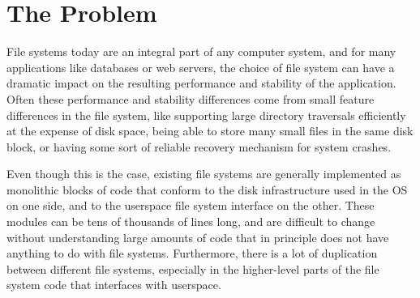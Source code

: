\section{The Problem}
\label{sec:problem}

File systems today are an integral part of any computer system, and for many
applications like databases or web servers, the choice of file system can have a
dramatic impact on the resulting performance and stability of the application.
Often these performance and stability differences come from small feature
differences in the file system, like supporting large directory traversals
efficiently at the expense of disk space, being able to store many small files
in the same disk block, or having some sort of reliable recovery mechanism for
system crashes.

Even though this is the case, existing file systems are generally implemented as
monolithic blocks of code that conform to the disk infrastructure used in the OS
on one side, and to the userspace file system interface on the other. These
modules can be tens of thousands of lines long, and are difficult to change
without understanding large amounts of code that in principle does not have
anything to do with file systems. Furthermore, there is a lot of duplication
between different file systems, especially in the higher-level parts of the file
system code that interfaces with userspace.

